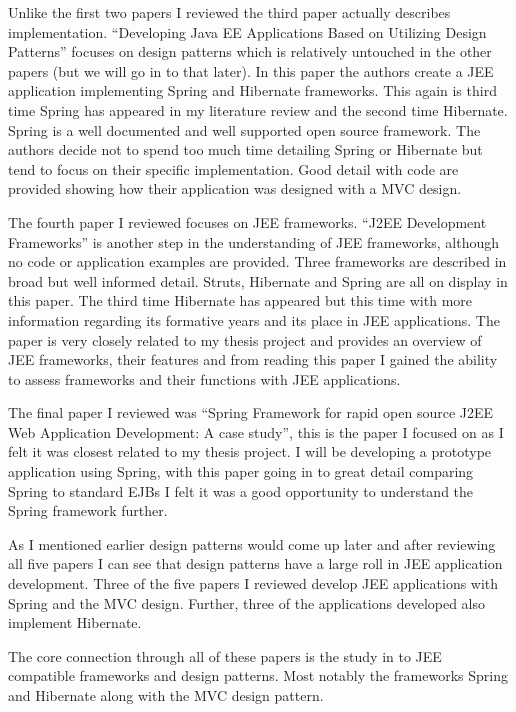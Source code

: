 \documentclass{article}
\begin{document}
Unlike the first two papers I reviewed the third paper actually describes implementation. “Developing Java EE Applications Based on Utilizing Design Patterns” focuses on design patterns which is relatively untouched in the other papers (but we will go in to that later). In this paper the authors create a JEE application implementing Spring and Hibernate frameworks. This again is third time Spring has appeared in my literature review and the second time Hibernate. Spring is a well documented and well supported open source framework. The authors decide not to spend too much time detailing Spring or Hibernate but tend to focus on their specific implementation. Good detail with code are provided showing how their application was designed with a MVC design.

The fourth paper I reviewed focuses on JEE frameworks. “J2EE Development Frameworks” is another step in the understanding of JEE frameworks, although no code or application examples are provided. Three frameworks are described in broad but well informed detail. Struts, Hibernate and Spring are all on display in this paper. The third time Hibernate has appeared but this time with more information regarding its formative years and its place in JEE applications. The paper is very closely related to my thesis project and provides an overview of JEE frameworks, their features and from reading this paper I gained the ability to assess frameworks and their functions with JEE applications. 

The final paper I reviewed was “Spring Framework for rapid open source J2EE Web Application Development: A case study”, this is the paper I focused on as I felt it was closest related to my thesis project. I will be developing a prototype application using Spring, with this paper going in to great detail comparing Spring to standard EJBs I felt it was a good opportunity to understand the Spring framework further.

As I mentioned earlier design patterns would come up later and after reviewing all five papers I can see that design patterns have a large roll in JEE application development. Three of the five papers I reviewed develop JEE applications with Spring and the MVC design. Further, three of the applications developed also implement Hibernate.

The core connection through all of these papers is the study in to JEE compatible frameworks and design patterns. Most notably  the frameworks Spring and Hibernate along with the MVC design pattern.
\end{document}
